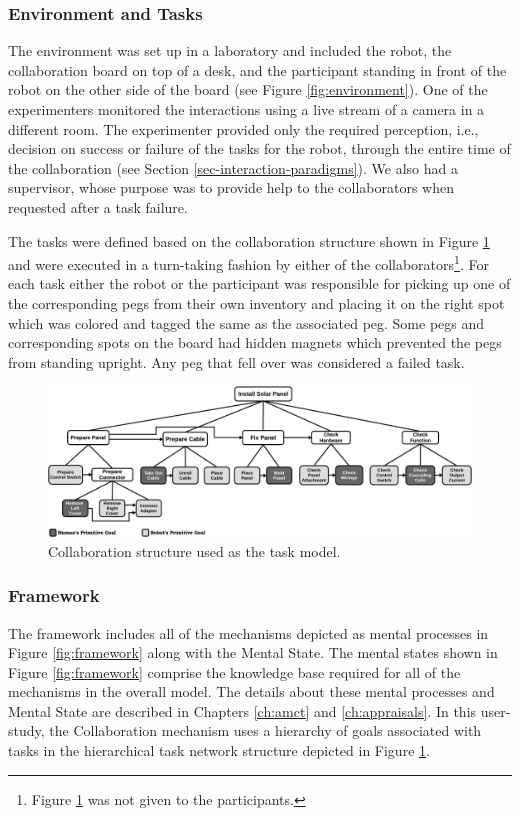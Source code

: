 \documentclass[12pt]{report}
\begin{document}
\subsubsection{Environment and Tasks}

The environment was set up in a laboratory and included the robot, the
collaboration board on top of a desk, and the participant standing in front of
the robot on the other side of the board (see Figure \ref{fig:environment}). One
of the experimenters monitored the interactions using a live stream of a camera
in a different room. The experimenter provided only the required perception,
i.e., decision on success or failure of the tasks for the robot, through the
entire time of the collaboration (see Section \ref{sec-interaction-paradigms}).
{\color{red}We also had a supervisor, whose purpose was to provide help to the
collaborators when requested after a task failure.}

The tasks were defined based on the collaboration structure shown in Figure
\ref{fig:collaboration_structure} and were executed in a turn-taking fashion by
either of the collaborators\footnote{{\color{red}Figure
\ref{fig:collaboration_structure} was not given to the participants.}}. For each
task either the robot or the participant was responsible for picking up one of
the corresponding pegs from their own inventory and placing it on the right spot
which was colored and tagged the same as the associated peg. Some pegs and
corresponding spots on the board had hidden magnets which prevented the pegs
from standing upright. Any peg that fell over was considered a failed task.

\begin{figure}[tbh]
  \centering
  \includegraphics[width=1\textwidth]{figure/collaborationStructure.pdf}
  \caption{Collaboration structure used as the task model.}
  \label{fig:collaboration_structure}
\end{figure}

\subsubsection{Framework}
\label{sec:theory}
The framework includes all of the mechanisms depicted as mental processes in
Figure \ref{fig:framework} along with the Mental State. The mental
states shown in Figure \ref{fig:framework} comprise the knowledge base required
for all of the mechanisms in the overall model. The details about these mental
processes and Mental State are described in Chapters \ref{ch:amct} and
\ref{ch:appraisals}. In this user-study, the Collaboration mechanism uses a
hierarchy of goals associated with tasks in the hierarchical task network
structure depicted in Figure \ref{fig:collaboration_structure}.
\end{document}
